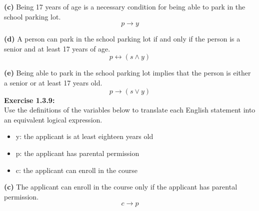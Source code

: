 \documentclass[12pt, letterpaper, twoside]{article}
\begin{document}
\noindent \textbf{(c)} Being 17 years of age is a necessary condition for being able to park in the school parking lot.
\[p \to y\]

\noindent \textbf{(d)} A person can park in the school parking lot if and only if the person is a senior and at least 17 years of age.
\[p \leftrightarrow (s \land y)\]

\noindent \textbf{(e)} Being able to park in the school parking lot implies that the person is either a senior or at least 17 years old.
\[p \to (s \lor y)\]
\newpage
\noindent\textbf{Exercise 1.3.9:}\\
Use the definitions of the variables below to translate each English statement into an equivalent logical expression.
\begin{itemize}
\item y: the applicant is at least eighteen years old
\item p: the applicant has parental permission
\item c: the applicant can enroll in the course
\end{itemize}
\textbf{(c)} The applicant can enroll in the course only if the applicant has parental permission.
\[c \to p\]
\end{document}
